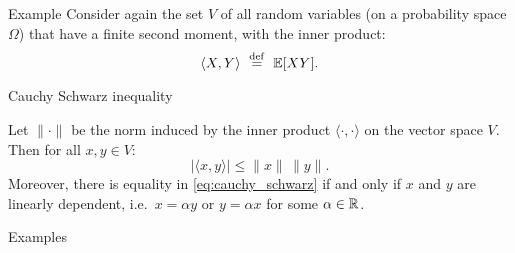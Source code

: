\documentclass{beamer}
\begin{document}
\begin{frame}[t]{Example}
	Consider again the set $V$ of all random variables (on a probability space $\Omega$) that have a finite second moment, with the inner product:
	$$\langle X, Y \rangle \ \defeq  \ \E[XY].$$
\end{frame}

\begin{frame}[t]{Cauchy Schwarz inequality}
\begin{theorem}
	Let $\| \cdot \|$ be the norm induced by the inner product $\langle \cdot , \cdot \rangle$ on the vector space $V$. Then for all $x,y \in V$:
	\begin{equation}\label{eq:cauchy_schwarz}
	| \langle x,y \rangle | \leq \|x\| \, \|y\|.
	\end{equation}
	Moreover, there is equality in \eqref{eq:cauchy_schwarz} if and only if $x$ and $y$ are linearly dependent, i.e.\ $x = \alpha y$ or $y = \alpha x$ for some $\alpha \in \mathbb{R}$.
\end{theorem}
\end{frame}


\begin{frame}[t]{Examples}
\end{frame}
\end{document}

